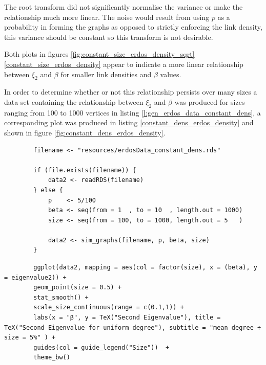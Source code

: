 \documentclass[11pt]{report}
\begin{document}
The root transform did not significantly normalise the variance or make the
relationship much more linear. The noise would result from using \(p\) as a
probability in forming the graphs as opposed to strictly enforcing the link
density, this variance should be constant so this transform is not desirable.

Both plots in figures
\ref{fig:constant_size_erdos_density_sqrt}
\ref{constant_size_erdos_density}
appear to indicate a more linear relationship between \(\xi_{2}\) and \(\beta\) for smaller link densities and \(\beta\) values.


In order to determine whether or not this relationship persists over many sizes a data set containing the relationship between \(\xi_{2}\) and \(\beta\) was produced for sizes ranging from 100 to 1000 vertices in listing \ref{l:gen_erdos_data_constant_dens}, a corresponding plot was produced in listing \ref{constant_dens_erdos_density} and shown in figure \ref{fig:constant_dens_erdos_density}.


\begin{listing}[htbp]
    \begin{tcolorbox}
        \begin{verbatim}
        filename <- "resources/erdosData_constant_dens.rds"

        if (file.exists(filename)) {
            data2 <- readRDS(filename)
        } else {
            p    <- 5/100
            beta <- seq(from = 1  , to = 10  , length.out = 1000)
            size <- seq(from = 100, to = 1000, length.out = 5   )

            data2 <- sim_graphs(filename, p, beta, size)
        }
        \end{verbatim}
    \end{tcolorbox}
\caption{\label{l:gen_erdos_data_constant_dens}Produce a data set of a variety of sizes ranging from 100 to 1000 vertices.}
\end{listing}

\begin{listing}[htbp]
    \begin{tcolorbox}
        \begin{verbatim}
        ggplot(data2, mapping = aes(col = factor(size), x = (beta), y = eigenvalue2)) +
        geom_point(size = 0.5) +
        stat_smooth() +
        scale_size_continuous(range = c(0.1,1)) +
        labs(x = "β", y = TeX("Second Eigenvalue"), title = TeX("Second Eigenvalue for uniform degree"), subtitle = "mean degree ÷ size = 5%" ) +
        guides(col = guide_legend("Size"))  +
        theme_bw()
        \end{verbatim}
    \end{tcolorbox}
\caption{\label{constant_dens_erdos_density}listing:constant\textsubscript{size}\textsubscript{erdos}\textsubscript{density}}
\end{listing}
\end{document}
